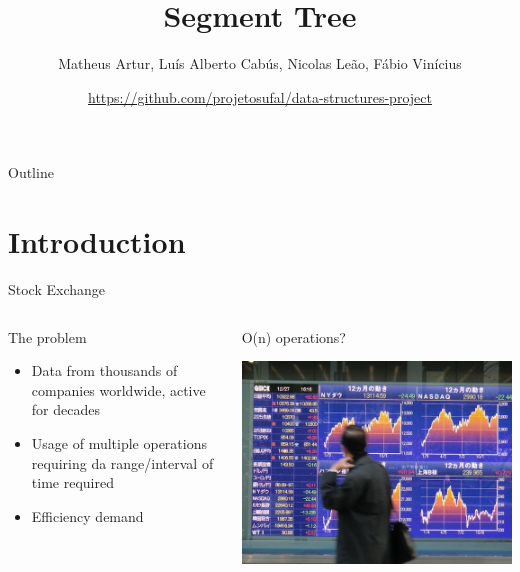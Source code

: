 \documentclass[presentation,12pt]{beamer}
\author{Matheus Artur, Luís Alberto Cabús, Nicolas Leão, Fábio Vinícius}
\date{\url{https://github.com/projetosufal/data-structures-project}}
\title{Segment Tree}
\begin{document}
\maketitle
\begin{frame}{Outline}
\tableofcontents
\end{frame}


\section{Introduction}
\label{sec:org5f3c0ad}

\begin{frame}[label={sec:orgcd2b5b6}]{Stock Exchange}
\begin{columns}
\begin{column}{0.48\columnwidth}
\begin{block}{The problem}
\begin{itemize}
\item Data from thousands of companies worldwide, active for decades
\item Usage of multiple operations requiring da range/interval of time required
\item Efficiency demand
\end{itemize}
\end{block}
\end{column}

\begin{column}{0.48\columnwidth}
\begin{block}{O(n) operations?}
\begin{center}
\includegraphics[width=.9\linewidth]{./img/serv.png}
\end{center}
\end{block}
\end{column}
\end{columns}
\end{frame}
\end{document}
